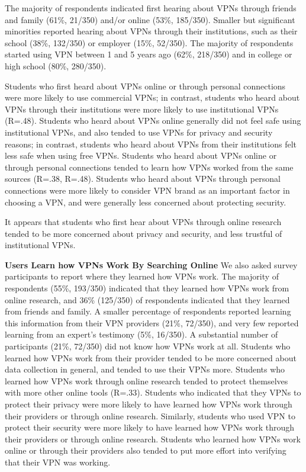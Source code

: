 The majority of respondents indicated first hearing about VPNs through friends
and family (61\%, 21/350) and/or online (53\%, 185/350). Smaller but
significant minorities reported hearing about VPNs through their institutions,
such as their school (38\%, 132/350) or employer (15\%, 52/350). The majority
of respondents started using VPN between 1 and 5 years ago (62\%, 218/350) and
in college or high school (80\%, 280/350).

Students who first heard about VPNs online or through personal connections
were more likely to use commercial VPNs; in contrast, students who heard about
VPNs through their institutions were more likely to use institutional VPNs
(R=.48). Students who heard about VPNs online generally did not feel safe
using institutional VPNs, and also tended to use VPNs for privacy and security
reasons; in contrast, students who heard about VPNs from their institutions
felt less safe when using free VPNs. Students who heard about VPNs online or
through personal connections tended to learn how VPNs worked from the same
sources (R=.38, R=.48). Students who heard about VPNs through personal
connections were more likely to consider VPN brand as an important factor in
choosing a VPN, and were generally less concerned about protecting security.

It appears that students who first hear about VPNs through online research
tended to be more concerned about privacy and security, and less trustful of
institutional VPNs. 

\textbf{Users Learn how VPNs Work By Searching Online}
We also asked survey participants to report where they learned how VPNs work.
The majority of respondents (55\%, 193/350) indicated that they learned how
VPNs work from online research, and 36\% (125/350) of respondents indicated
that they learned from friends and family. A smaller percentage of respondents
reported learning this information from their VPN providers (21\%, 72/350),
and very few reported learning from an expert’s testimony (5\%, 16/350). A
substantial number of participants (21\%, 72/350) did not know how VPNs work
at all.  Students who learned how VPNs work from their provider tended to be
more concerned about data collection in general, and tended to use their VPNs
more. Students who learned how VPNs work through online research tended to
protect themselves with more other online tools (R=.33). Students who
indicated that they VPNs to protect their privacy were more likely to have
learned how VPNs work through their providers or through online research.
Similarly, students who used VPN to protect their security were more likely to
have learned how VPNs work through their providers or through online research.
Students who learned how VPNs work online or through their providers also
tended to put more effort into verifying that their VPN was working.

